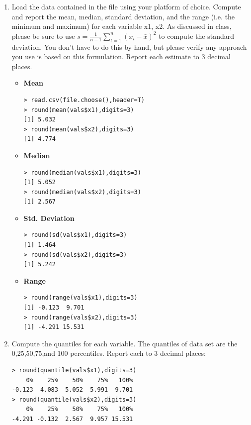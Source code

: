\documentclass[fontsize=10pt]{scrartcl}
\begin{document}
	\begin{enumerate}
		\item
		Load the data contained in the file using your platform of choice. Compute and report the mean, median, standard deviation, and the range (i.e. the minimum and maximum) for each variable x1, x2. As discussed in class, please be sure to use $s = \frac{1}{n-1} \sum_{t=1}^{n} (x_i - \bar{x})^2$ to compute the standard deviation. You don’t have to do this by hand, but please verify any approach you use is based on this formulation. Report each estimate to 3 decimal places.
		\begin{itemize}
			
			\item
			\textbf{\large Mean} \\
\begin{verbatim}
> read.csv(file.choose(),header=T)
> round(mean(vals$x1),digits=3)
[1] 5.032
> round(mean(vals$x2),digits=3)
[1] 4.774

\end{verbatim}

			\item
			\textbf{\large Median} \\
\begin{verbatim}
> round(median(vals$x1),digits=3)
[1] 5.052
> round(median(vals$x2),digits=3)
[1] 2.567

\end{verbatim}

			\item
			\textbf{\large Std. Deviation} \\
\begin{verbatim}
> round(sd(vals$x1),digits=3)
[1] 1.464
> round(sd(vals$x2),digits=3)
[1] 5.242

\end{verbatim}

			\item
			\textbf{\large Range} \\
\begin{verbatim}
> round(range(vals$x1),digits=3)
[1] -0.123  9.701
> round(range(vals$x2),digits=3)
[1] -4.291 15.531

\end{verbatim}

		\end{itemize}

		\item
		Compute the quantiles for each variable. The quantiles of data set are the 0,25,50,75,and 100 percentiles. Report each to 3 decimal places: \\
\begin{verbatim}
> round(quantile(vals$x1),digits=3)
    0%    25%    50%    75%   100% 
-0.123  4.083  5.052  5.991  9.701 
> round(quantile(vals$x2),digits=3)
    0%    25%    50%    75%   100% 
-4.291 -0.132  2.567  9.957 15.531 


\end{verbatim}
\end{enumerate}
\end{document}
